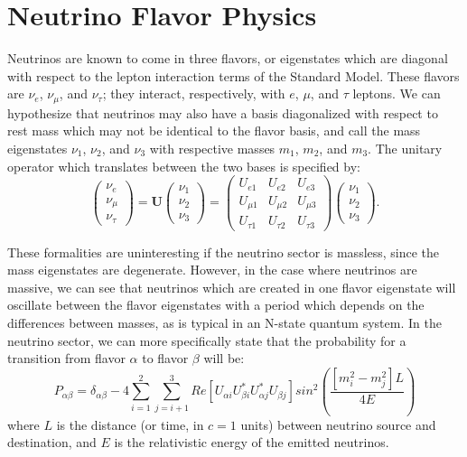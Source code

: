 \section{Neutrino Flavor Physics}\label{sec:NeutrinoFlavorPhysics}

Neutrinos are known to come in three flavors, or eigenstates which are diagonal with respect to the lepton interaction terms of the Standard Model.  These flavors are $\nu_e$, $\nu_\mu$, and $\nu_\tau$; they interact, respectively, with $e$, $\mu$, and $\tau$ leptons.  We can hypothesize that neutrinos may also have a basis diagonalized with respect to rest mass which may not be identical to the flavor basis, and call the mass eigenstates $\nu_1$, $\nu_2$, and $\nu_3$ with respective masses $m_1$, $m_2$, and $m_3$.  The unitary operator which translates between the two bases is specified by:
\begin{equation} \label{eqn:ShortDefinitionOfU}
\begin{pmatrix} \nu_e \\ \nu_\mu \\ \nu_\tau \end{pmatrix}
=
\mathbf{U}
\begin{pmatrix} \nu_1 \\ \nu_2 \\ \nu_3 \end{pmatrix}
=
\begin{pmatrix}
U_{e1} & U_{e2} & U_{e3} \\
U_{\mu1} & U_{\mu2} & U_{\mu3} \\
U_{\tau1} & U_{\tau2} & U_{\tau3}
\end{pmatrix}
\begin{pmatrix} \nu_1 \\ \nu_2 \\ \nu_3 \end{pmatrix}.
\end{equation}

These formalities are uninteresting if the neutrino sector is massless, since the mass eigenstates are degenerate.  However, in the case where neutrinos are massive, we can see that neutrinos which are created in one flavor eigenstate will oscillate between the flavor eigenstates with a period which depends on the differences between masses, as is typical in an N-state quantum system.  In the neutrino sector, we can more specifically state that the probability for a transition from flavor $\alpha$ to flavor $\beta$ will be:~\cite{RevModPhys.75.345}
\begin{equation}
P_{\alpha \beta} = \delta_{\alpha \beta} - 4 \sum_{i=1}^2 \sum_{j=i+1}^3 Re \left[ U_{\alpha i} U^{*}_{\beta i} U^{*}_{\alpha j} U_{\beta j} \right] sin^2 \left( \frac{ \left[m_i^2 - m_j^2\right]L}{4E} \right)
\end{equation}
where $L$ is the distance (or time, in $c=1$ units) between neutrino source and destination, and $E$ is the relativistic energy of the emitted neutrinos.

